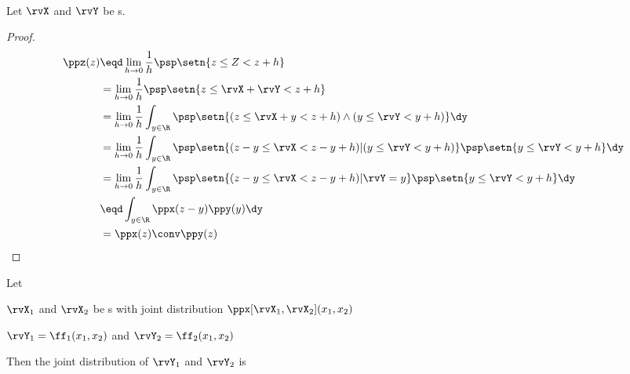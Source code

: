 \begin{theorem}
\mbox{}\\
Let $\rvX$ and $\rvY$ be s.
\end{theorem}
\begin{proof}
\begin{align*}
  \ppz(z)
    &\eqd \lim_{h\to0}\frac{1}{h} \psp\setn{z \le Z < z+h }
  \\&=    \lim_{h\to0}\frac{1}{h} \psp\setn{z \le\rvX+\rvY < z+h }
  \\&=    \lim_{h\to0}\frac{1}{h} \int_{y\in\R} \psp\setn{(z \le\rvX+y < z+h) \land (y\le\rvY<y+h) } \dy
  \\&=    \lim_{h\to0}\frac{1}{h} \int_{y\in\R} \psp\setn{(z-y \le\rvX < z-y+h) | (y\le\rvY<y+h) }\psp\setn{y\le\rvY<y+h} \dy
  \\&=    \lim_{h\to0}\frac{1}{h} \int_{y\in\R} \psp\setn{(z-y \le\rvX < z-y+h) |\rvY=y }\psp\setn{y\le\rvY<y+h} \dy
  \\&\eqd \int_{y\in\R} \ppx(z-y) \ppy(y)  \dy
  \\&=    \ppx(z) \conv \ppy(z)
\end{align*}
\end{proof}

\begin{theorem}
\label{thm:x1x2->y1y2}
Let
\begin{liste}
  \item $\rvX_1$ and $\rvX_2$ be s with joint distribution
        $\ppx[\rvX_1,\rvX_2](x_1,x_2)$
  \item $\rvY_1=\ff_1(x_1,x_2)$ and $\rvY_2=\ff_2(x_1,x_2)$
\end{liste}
Then the joint distribution of $\rvY_1$ and $\rvY_2$ is
\end{theorem}

